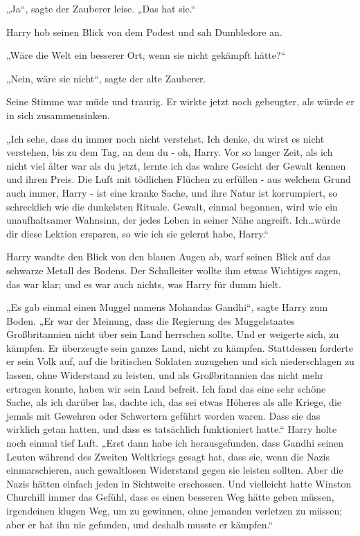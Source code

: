 {„Ja“, sagte der Zauberer leise. „Das hat sie.“

Harry hob seinen Blick von dem Podest und sah Dumbledore an.

„Wäre die Welt ein besserer Ort, wenn sie nicht gekämpft hätte?“

„Nein, wäre sie nicht“, sagte der alte Zauberer.

Seine Stimme war müde und traurig. Er wirkte jetzt noch gebeugter, als würde er in sich zusammensinken.

„Ich sehe, dass du immer noch nicht verstehst. Ich denke, du wirst es nicht verstehen, bis zu dem Tag, an dem du - oh, Harry. Vor so langer Zeit, als ich nicht viel älter war als du jetzt, lernte ich das wahre Gesicht der Gewalt kennen und ihren Preis. Die Luft mit tödlichen Flüchen zu erfüllen - aus welchem Grund auch immer, Harry - ist eine kranke Sache, und ihre Natur ist korrumpiert, so schrecklich wie die dunkelsten Rituale. Gewalt, einmal begonnen, wird wie ein unaufhaltsamer Wahnsinn, der jedes Leben in seiner Nähe angreift. Ich…würde dir diese Lektion ersparen, so wie ich sie gelernt habe, Harry.“

Harry wandte den Blick von den blauen Augen ab, warf seinen Blick auf das schwarze Metall des Bodens. Der Schulleiter wollte ihm etwas Wichtiges sagen, das war klar; und es war auch nichts, was Harry für dumm hielt.

„Es gab einmal einen Muggel namens Mohandas Gandhi“, sagte Harry zum Boden. „Er war der Meinung, dass die Regierung des Muggelstaates Großbritannien nicht über sein Land herrschen sollte. Und er weigerte sich, zu kämpfen. Er überzeugte sein ganzes Land, nicht zu kämpfen. Stattdessen forderte er sein Volk auf, auf die britischen Soldaten zuzugehen und sich niederschlagen zu lassen, ohne Widerstand zu leisten, und als Großbritannien das nicht mehr ertragen konnte, haben wir sein Land befreit. Ich fand das eine sehr schöne Sache, als ich darüber las, dachte ich, das sei etwas Höheres als alle Kriege, die jemals mit Gewehren oder Schwertern geführt worden waren. Dass sie das wirklich getan hatten, und dass es tatsächlich funktioniert hatte.“ Harry holte noch einmal tief Luft. „Erst dann habe ich herausgefunden, dass Gandhi seinen Leuten während des Zweiten Weltkriegs gesagt hat, dass sie, wenn die Nazis einmarschieren, auch gewaltlosen Widerstand gegen sie leisten sollten. Aber die Nazis hätten einfach jeden in Sichtweite erschossen. Und vielleicht hatte Winston Churchill immer das Gefühl, dass es einen besseren Weg hätte geben müssen, irgendeinen klugen Weg, um zu gewinnen, ohne jemanden verletzen zu müssen; aber er hat ihn nie gefunden, und deshalb musste er kämpfen.“

}

